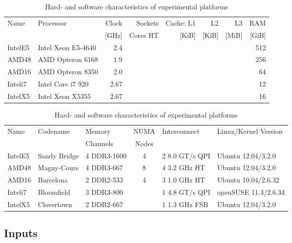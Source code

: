 \documentclass[a4paper]{myjournal}
\begin{document}
\begin{table}\centering\small\def\tabcolsep{3.5pt}
\caption{Hard- and software characteristics of experimental platforms}\label{tab:hardware}
\begin{tabular}{l|l|r|r||r|r|r|r}
Name    & Processor          & Clock & Sockets                      & Cache: L1      & L2              & L3            & RAM   \\
        &                    & [GHz] & Cores  HT                    & [KiB]          & [KiB]           & [MiB]         & [GiB] \\\hline
IntelE5 & Intel Xeon E5-4640 & 2.4   &                 &  &  &  & 512   \\
AMD48   & AMD Opteron 6168   & 1.9   &  &  &  &   & 256   \\
AMD16   & AMD Opteron 8350   & 2.0   &   &  &  &   & 64    \\
Inteli7 & Intel Core i7 920  & 2.67  &                 &   &   &   & 12    \\
IntelX5 & Intel Xeon X5355   & 2.67  &                 &   &  &               & 16    \\ 
\end{tabular}

\bigskip
\def\tabcolsep{2.0pt}
\begin{tabular}{l|l|l|c|l|l}
Name    & Codename     & Memory               & NUMA  & Interconnect            & Linux/Kernel Version \\
        &              & Channels             & Nodes &                         &                      \\ \hline
IntelE5 & Sandy Bridge & 4  DDR3-1600 & 4     & 2  8.0 GT/s QPI & Ubuntu 12.04/3.2.0   \\
AMD48   & Magny-Cours  & 4  DDR3-667  & 8     & 4  3.2 GHz HT   & Ubuntu 12.04/3.2.0   \\
AMD16   & Barcelona    & 2  DDR2-533  & 4     & 3  1.0 GHz HT   & Ubuntu 10.04/2.6.32  \\
Inteli7 & Bloomfield   & 3  DDR3-800  &       & 1  4.8 GT/s QPI & openSUSE 11.3/2.6.34 \\
IntelX5 & Clovertown   & 2  DDR2-667  &       & 1  1.3 GHz FSB  & Ubuntu 12.04/3.2.0   \\
\end{tabular}
\end{table}

\subsection{Inputs}\label{sec:exp-inputs}
\end{document}

